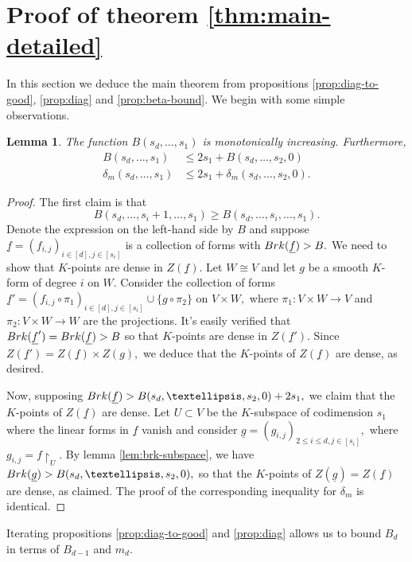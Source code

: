 \documentclass[10pt,a4paper]{amsart}
\let\ul\underline
\newtheorem{lemma}[theorem]{Lemma}
\theoremstyle{definition}
\newcommand{\brk}{\textnormal{Brk}}
\begin{document}
\section{Proof of theorem \ref{thm:main-detailed}}

In this section we deduce the main theorem from  propositions \ref{prop:diag-to-good}, \ref{prop:diag} and \ref{prop:beta-bound}. We begin with some simple observations.

\begin{lemma}\label{lem:monotone+linears}
    The function $B(s_d,\ldots,s_1)$ is monotonically increasing. Furthermore, 
    \begin{align*}
        B(s_d,\ldots,s_1) &\le 2s_1+B(s_d,\ldots,s_2,0) \\
        \delta_m(s_d,\ldots,s_1) &\le 2s_1+\delta_m(s_d,\ldots,s_2,0).
    \end{align*}
\end{lemma}

\begin{proof}
    The first claim is that 
    \[
    B(s_d,\ldots,s_i+1,\ldots,s_1) \ge B(s_d,\ldots,s_i,\ldots,s_1).
    \]
    Denote the expression on the left-hand side by $B$ and suppose $\ul{f} = (f_{i,j})_{i\in [d],j\in [s_i]}$ is a collection of forms with $\brk(\ul{f}) > B.$ We need to show that $K$-points are dense in $Z(\ul{f}).$ Let $W\cong V$ and let $g$ be a smooth $K$-form of degree $i$ on $W.$ Consider the collection of forms $\ul{f}' = (f_{i,j}\circ \pi_1)_{i\in [d],j\in [s_i]} \cup\{g\circ \pi_2\}$ on $V\times W,$ where $\pi_1:V\times W\to V $ and $\pi_2:V\times W\to W$ are the projections. It's easily verified that $\brk(\ul{f}') = \brk(\ul{f}) > B$ so that $K$-points are dense in $Z(\ul{f}').$ Since $Z(\ul{f}') = Z(\ul{f})\times Z(g),$ we deduce that the $K$-points of $Z(\ul{f})$ are dense, as desired. 

     Now, supposing $\brk(\ul{f}) > B(s_d,\ldots,s_2,0)+2s_1,$ we claim that the $K$-points of $Z(\ul{f})$ are dense. Let $U\subset V$ be the $K$-subspace of codimension $s_1$ where the linear forms in $\ul{f}$ vanish and consider $\ul{g} = (g_{i,j})_{2\le i\le d, j\in [s_i]},$ where $g_{i,j} = f\restriction_U.$ By lemma \ref{lem:brk-subspace}, we have $\brk(\ul{g}) > B(s_d,\ldots,s_2,0),$ so that the $K$-points of $Z(\ul{g}) = Z(\ul{f})$ are dense, as claimed. The proof of the corresponding inequality for $\delta_m$ is identical.
\end{proof}
 
Iterating propositions \ref{prop:diag-to-good} and \ref{prop:diag} allows us to bound $B_d$ in terms of $B_{d-1}$ and $m_d.$
\end{document}
